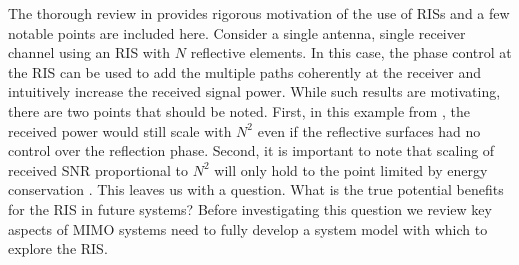 The thorough review in \cite{basar2019wireless} provides rigorous motivation of the use of RISs and a few notable points are included here.
Consider a single antenna, single receiver channel using an RIS with $N$ reflective elements. In this case, the phase control at the RIS can be used to add the multiple paths coherently at the receiver and intuitively increase the received signal power. While such results are motivating, there are two points that should be noted. First, in this example from \cite{basar2019wireless}, the received power would still scale with $N^2$ even if the reflective surfaces had no control over the reflection phase. Second, it is important to note that scaling of received SNR proportional to $N^2$ will only hold to the point limited by energy conservation \cite{bjornson2019demystifying}.
This leaves us with a question. What is the true potential benefits for the RIS in future systems?
Before investigating this question we review key aspects of MIMO systems need to fully develop a system model with which to explore the RIS. 